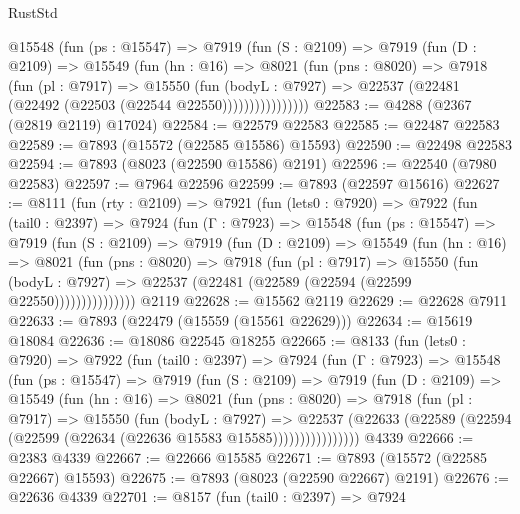 \begin{lexlean}{RustStd}
\begin{coremodule}
            @15548
              (fun (ps : @15547) =>
              @7919
                (fun (S : @2109) =>
                @7919
                  (fun (D : @2109) =>
                  @15549
                    (fun (hn : @16) =>
                    @8021
                      (fun (pns : @8020) =>
                      @7918
                        (fun (pl : @7917) =>
                        @15550
                          (fun (bodyL : @7927) =>
                          @22537 (@22481 (@22492 (@22503 (@22544 @22550))))))))))))))))
@22583 := @4288 (@2367 (@2819 @2119) @17024)
@22584 := @22579 @22583
@22585 := @22487 @22583
@22589 := @7893 (@15572 (@22585 @15586) @15593)
@22590 := @22498 @22583
@22594 := @7893 (@8023 (@22590 @15586) @2191)
@22596 := @22540 (@7980 @22583)
@22597 := @7964 @22596
@22599 := @7893 (@22597 @15616)
@22627 := @8111
    (fun (rty : @2109) =>
    @7921
      (fun (lets0 : @7920) =>
      @7922
        (fun (tail0 : @2397) =>
        @7924
          (fun (Γ : @7923) =>
          @15548
            (fun (ps : @15547) =>
            @7919
              (fun (S : @2109) =>
              @7919
                (fun (D : @2109) =>
                @15549
                  (fun (hn : @16) =>
                  @8021
                    (fun (pns : @8020) =>
                    @7918
                      (fun (pl : @7917) =>
                      @15550
                        (fun (bodyL : @7927) =>
                        @22537 (@22481 (@22589 (@22594 (@22599 @22550)))))))))))))))
    @2119
@22628 := @15562 @2119
@22629 := @22628 @7911
@22633 := @7893 (@22479 (@15559 (@15561 @22629)))
@22634 := @15619 @18084
@22636 := @18086 @22545 @18255
@22665 := @8133
    (fun (lets0 : @7920) =>
    @7922
      (fun (tail0 : @2397) =>
      @7924
        (fun (Γ : @7923) =>
        @15548
          (fun (ps : @15547) =>
          @7919
            (fun (S : @2109) =>
            @7919
              (fun (D : @2109) =>
              @15549
                (fun (hn : @16) =>
                @8021
                  (fun (pns : @8020) =>
                  @7918
                    (fun (pl : @7917) =>
                    @15550
                      (fun (bodyL : @7927) =>
                      @22537
                        (@22633
                          (@22589 (@22594 (@22599 (@22634 (@22636 @15583 @15585))))))))))))))))
    @4339
@22666 := @2383 @4339
@22667 := @22666 @15585
@22671 := @7893 (@15572 (@22585 @22667) @15593)
@22675 := @7893 (@8023 (@22590 @22667) @2191)
@22676 := @22636 @4339
@22701 := @8157
    (fun (tail0 : @2397) =>
    @7924

\end{coremodule}
\end{lexlean}
